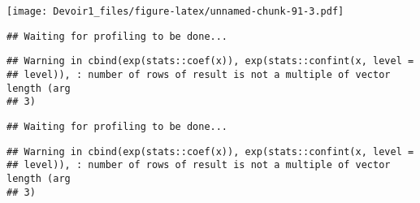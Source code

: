 \documentclass[]{article}
\newenvironment{Shaded}{\begin{snugshade}}{\end{snugshade}}
\newcommand{\KeywordTok}[1]{\textcolor[rgb]{0.13,0.29,0.53}{\textbf{#1}}}
\newcommand{\DataTypeTok}[1]{\textcolor[rgb]{0.13,0.29,0.53}{#1}}
\newcommand{\DecValTok}[1]{\textcolor[rgb]{0.00,0.00,0.81}{#1}}
\newcommand{\StringTok}[1]{\textcolor[rgb]{0.31,0.60,0.02}{#1}}
\newcommand{\OperatorTok}[1]{\textcolor[rgb]{0.81,0.36,0.00}{\textbf{#1}}}
\newcommand{\NormalTok}[1]{#1}
\begin{document}
\texttt{[image: Devoir1\_files/figure-latex/unnamed-chunk-91-3.pdf]}

\begin{Shaded}
\end{Shaded}

\begin{verbatim}
## Waiting for profiling to be done...
\end{verbatim}

\begin{verbatim}
## Warning in cbind(exp(stats::coef(x)), exp(stats::confint(x, level =
## level)), : number of rows of result is not a multiple of vector length (arg
## 3)
\end{verbatim}

\begin{verbatim}
## Waiting for profiling to be done...
\end{verbatim}

\begin{verbatim}
## Warning in cbind(exp(stats::coef(x)), exp(stats::confint(x, level =
## level)), : number of rows of result is not a multiple of vector length (arg
## 3)
\end{verbatim}
\end{document}
